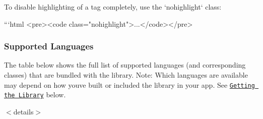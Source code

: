 \begin{DoxyCode}
To disable highlighting of a tag completely, use the `nohighlight` class:

```html
<pre><code class="nohighlight">...</code></pre>
\end{DoxyCode}


\subsubsection*{Supported Languages}

The table below shows the full list of supported languages (and corresponding classes) that are bundled with the library. Note\+: Which languages are available may depend on how you\textquotesingle{}ve built or included the library in your app. See \href{#getting-the-library}{\tt Getting the Library} below.

$<$details$>$

